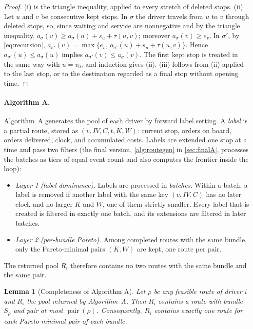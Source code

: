 \documentclass[11pt]{article}
\newtheorem{plemma}{Lemma}
\theoremstyle{definition}
\theoremstyle{remark}
\newcommand{\pair}{\operatorname{pair}}
\begin{document}
\begin{proof}
(i) is the triangle inequality, applied to every stretch of deleted stops.
(ii) Let $u$ and $v$ be consecutive kept stops. In $\sigma$ the driver travels
from $u$ to $v$ through deleted stops, so, since waiting and service are
nonnegative and by the triangle inequality,
$a_\sigma(v)\ge a_\sigma(u)+s_u+\tau(u,v)$; moreover $a_\sigma(v)\ge e_v$. In
$\sigma'$, by \eqref{eq:recursion},
$a_{\sigma'}(v)=\max\{e_v,\,a_{\sigma'}(u)+s_u+\tau(u,v)\}$. Hence
$a_{\sigma'}(u)\le a_\sigma(u)$ implies $a_{\sigma'}(v)\le a_\sigma(v)$. The
first kept stop is treated in the same way with $u=v_0$, and induction gives
(ii). (iii) follows from (ii) applied to the last stop, or to the destination
regarded as a final stop without opening time.
\end{proof}

\paragraph{Algorithm A.}
Algorithm~A generates the pool of each driver by forward label setting. A
\emph{label} is a partial route, stored as $(v,IV,C,t,K,W)$: current stop,
orders on board, orders delivered, clock, and accumulated costs. Labels are
extended one stop at a time and pass two filters (the final version,
\cref{alg:routegen} in \cref{sec:finalA}, processes the batches as tiers of
equal event count and also computes the frontier inside the loop):
\begin{itemize}[leftmargin=1.4em, itemsep=1pt]
\item \emph{Layer 1 (label dominance).} Labels are processed in
\emph{batches}. Within a batch, a label is removed if another label with the
same key $(v,IV,C)$ has no later clock and no larger $K$ and $W$, one of them
strictly smaller. Every label that is created is filtered in exactly one batch,
and its extensions are filtered in later batches.
\item \emph{Layer 2 (per-bundle Pareto).} Among completed routes with the same
bundle, only the Pareto-minimal pairs $(K,W)$ are kept, one route per pair.
\end{itemize}
The returned pool $R_i$ therefore contains no two routes with the same bundle
and the same pair.

\begin{plemma}[Completeness of Algorithm A]\label{lem:complete}
Let $\rho$ be any feasible route of driver $i$ and $R_i$ the pool returned by
Algorithm~A. Then $R_i$ contains a route with bundle $S_\rho$ and pair at most
$\pair(\rho)$. Consequently, $R_i$ contains exactly one route for each
Pareto-minimal pair of each bundle.
\end{plemma}
\end{document}

